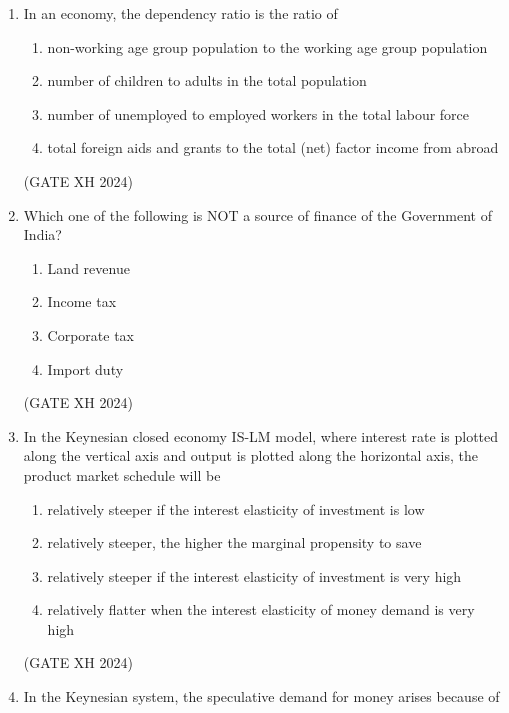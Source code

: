\documentclass{article}
\begin{document}
\begin{enumerate}
    \item In an economy, the dependency ratio is the ratio of
    
    \begin{enumerate}
        \item non-working age group population to the working age group population 
        \item number of children to adults in the total population
        \item number of unemployed to employed workers in the total labour force 
        \item total foreign aids and grants to the total (net) factor income from abroad
    \end{enumerate} \hfill (GATE XH 2024)
       
    \item Which one of the following is NOT a source of finance of the Government of India?
    
    \begin{multicols}{4}
        \begin{enumerate}
            \item Land revenue
            \item Income tax
            \item Corporate tax
            \item Import duty
        \end{enumerate}
    \end{multicols} \hfill (GATE XH 2024)

    \item In the Keynesian closed economy IS-LM model, where interest rate is plotted along the vertical axis and output is plotted along the horizontal axis, the product market schedule will be
    
    \begin{enumerate}
        \item relatively steeper if the interest elasticity of investment is low
        \item relatively steeper, the higher the marginal propensity to save
        \item relatively steeper if the interest elasticity of investment is very high
        \item relatively flatter when the interest elasticity of money demand is very high
    \end{enumerate} \hfill (GATE XH 2024)

    \item In the Keynesian system, the speculative demand for money arises because of
    

\end{enumerate}
\end{document}
